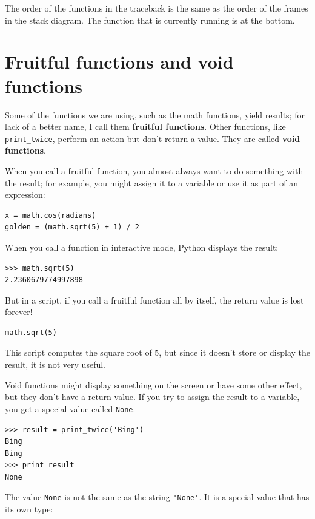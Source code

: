 \documentclass[10pt]{book}
\begin{document}

The order of the functions in the traceback is the same as the
order of the frames in the stack diagram.  The function that is
currently running is at the bottom.


\section{Fruitful functions and void functions}


Some of the functions we are using, such as the math functions, yield
results; for lack of a better name, I call them {\bf fruitful
  functions}.  Other functions, like \verb"print_twice", perform an
action but don't return a value.  They are called {\bf void
  functions}.

When you call a fruitful function, you almost always
want to do something with the result; for example, you might
assign it to a variable or use it as part of an expression:

\beforeverb
\begin{verbatim}
x = math.cos(radians)
golden = (math.sqrt(5) + 1) / 2
\end{verbatim}
\afterverb
%
When you call a function in interactive mode, Python displays
the result:

\beforeverb
\begin{verbatim}
>>> math.sqrt(5)
2.2360679774997898
\end{verbatim}
\afterverb
%
But in a script, if you call a fruitful function all by itself,
the return value is lost forever!

\beforeverb
\begin{verbatim}
math.sqrt(5)
\end{verbatim}
\afterverb
%
This script computes the square root of 5, but since it doesn't store
or display the result, it is not very useful.


Void functions might display something on the screen or have some
other effect, but they don't have a return value.  If you try to
assign the result to a variable, you get a special value called
{\tt None}.


\beforeverb
\begin{verbatim}
>>> result = print_twice('Bing')
Bing
Bing
>>> print result
None
\end{verbatim}
\afterverb
%
The value {\tt None} is not the same as the string \verb"'None'". 
It is a special value that has its own type:
\end{document}
